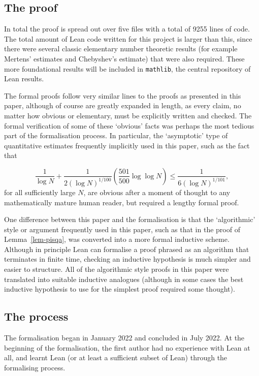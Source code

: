 \documentclass{amsart}
\newcommand{\brac}[1]{\left( #1\right)}
\begin{document}
\subsection{The proof}

In total the proof is spread out over five files with a total of 9255 lines of code. The total amount of Lean code written for this project is larger than this, since there were several classic elementary number theoretic results (for example Mertens' estimates and Chebyshev's estimate) that were also required. These more foundational results will be included in \texttt{mathlib}, the central repository of Lean results. 

The formal proofs follow very similar lines to the proofs as presented in this paper, although of course are greatly expanded in length, as every claim, no matter how obvious or elementary, must be explicitly written and checked. The formal verification of some of these `obvious' facts was perhaps the most tedious part of the formalisation process. In particular, the `asymptotic' type of quantitative estimates frequently implicitly used in this paper, such as the fact that 

\[\frac{1}{\log N}+\frac{1}{2(\log N)^{1/100}}\brac{\frac{501}{500}\log\log N}\leq \frac{1}{6(\log N)^{1/101}},\]
for all sufficiently large $N$, are obvious after a moment of thought to any mathematically mature human reader, but required a lengthy formal proof.

One difference between this paper and the formalisation is that the `algorithmic' style or argument frequently used in this paper, such as that in the proof of Lemma~\ref{lem-pisqa}, was converted into a more formal inductive scheme. Although in principle Lean can formalise a proof phrased as an algorithm that terminates in finite time, checking an inductive hypothesis is much simpler and easier to structure. All of the algorithmic style proofs in this paper were translated into suitable inductive analogues (although in some cases the best inductive hypothesis to use for the simplest proof required some thought).
\subsection{The process}

The formalisation began in January 2022 and concluded in July 2022. At the beginning of the formalisation, the first author had no experience with Lean at all, and learnt Lean (or at least a sufficient subset of Lean) through the formalising process. 
\end{document}
